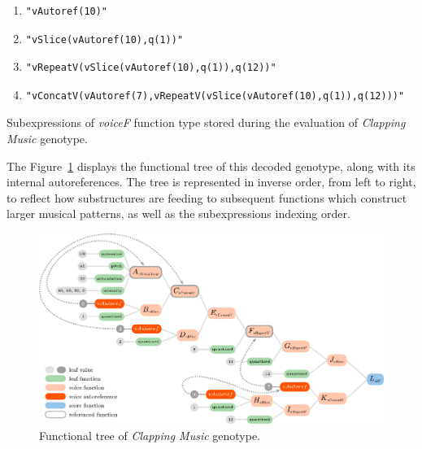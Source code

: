 \documentclass{article}
\begin{document}
\begin{table}[ht]
{\begin{enumerate}[start=0]
\begin{verbatim}
"vAutoref(7)"
\end{verbatim}
\item \begin{verbatim}
"vAutoref(10)"
\end{verbatim}
\item \begin{verbatim}
"vSlice(vAutoref(10),q(1))"
\end{verbatim}
\item \begin{verbatim}
"vRepeatV(vSlice(vAutoref(10),q(1)),q(12))"
\end{verbatim}
\item \begin{verbatim}
"vConcatV(vAutoref(7),vRepeatV(vSlice(vAutoref(10),q(1)),q(12)))"
\end{verbatim}
\end{enumerate}}
\hrulefill
\vspace{0.4cm}
\caption{Subexpressions of \emph{voiceF} function type stored during the evaluation of \emph{Clapping Music} genotype.}
\label{table:subexp}
\end{table}

The Figure~\ref{fig:claptree} displays the functional tree of this decoded genotype, along with its internal autoreferences. The tree is represented in inverse order, from left to right, to reflect how substructures are feeding to subsequent functions which construct larger musical patterns, as well as the subexpressions indexing order.

\begin{figure}
  \includegraphics[width=\linewidth]{figs/clapping_tree_graph_colours_code.pdf}
  \caption{Functional tree of \emph{Clapping Music} genotype.}
  \label{fig:claptree}
\end{figure}
\end{document}
